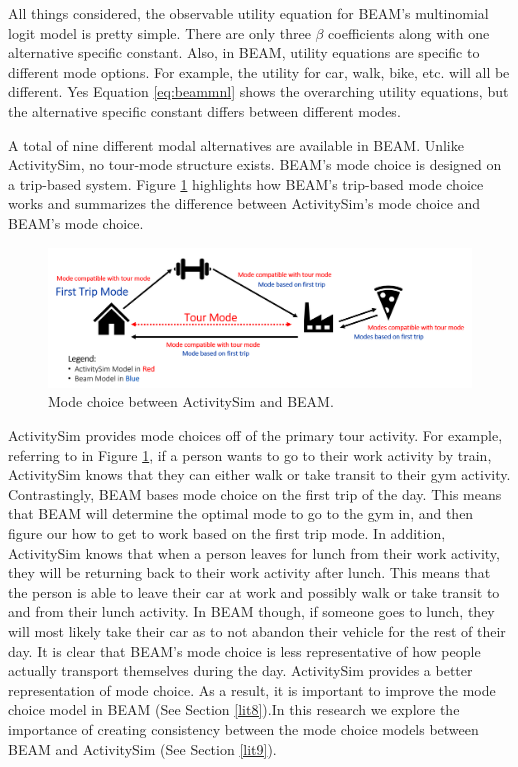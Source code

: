 \documentclass[3p, authoryear, review]{elsarticle} %
\begin{document}
All things considered, the observable utility equation for BEAM's multinomial logit model is pretty simple. There are only three \(\beta\) coefficients along with one alternative specific constant. Also, in BEAM, utility equations are specific to different mode options. For example, the utility for car, walk, bike, etc. will all be different. Yes Equation \eqref{eq:beammnl} shows the overarching utility equations, but the alternative specific constant differs between different modes.

A total of nine different modal alternatives are available in BEAM. Unlike ActivitySim, no tour-mode structure exists. BEAM's mode choice is designed on a trip-based system. Figure \ref{fig:fig-mode-compare} highlights how BEAM's trip-based mode choice works and summarizes the difference between ActivitySim's mode choice and BEAM's mode choice.

\begin{figure}

{\centering \includegraphics[width=1\linewidth]{pics/asim-beam-compare} 

}

\caption{Mode choice between ActivitySim and BEAM.}\label{fig:fig-mode-compare}
\end{figure}

ActivitySim provides mode choices off of the primary tour activity. For example, referring to in Figure \ref{fig:fig-mode-compare}, if a person wants to go to their work activity by train, ActivitySim knows that they can either walk or take transit to their gym activity. Contrastingly, BEAM bases mode choice on the first trip of the day. This means that BEAM will determine the optimal mode to go to the gym in, and then figure our how to get to work based on the first trip mode. In addition, ActivitySim knows that when a person leaves for lunch from their work activity, they will be returning back to their work activity after lunch. This means that the person is able to leave their car at work and possibly walk or take transit to and from their lunch activity. In BEAM though, if someone goes to lunch, they will most likely take their car as to not abandon their vehicle for the rest of their day. It is clear that BEAM's mode choice is less representative of how people actually transport themselves during the day. ActivitySim provides a better representation of mode choice. As a result, it is important to improve the mode choice model in BEAM (See Section \ref{lit8}).In this research we explore the importance of creating consistency between the mode choice models between BEAM and ActivitySim (See Section \ref{lit9}).
\end{document}
